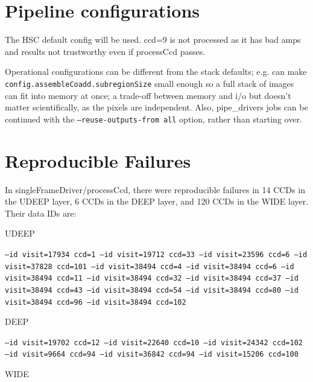\section{Pipeline configurations}
The HSC default config will be used. ccd=9 is not processed as it has bad amps and results not trustworthy even if processCcd passes.

Operational configurations can be different from the stack defaults; e.g. can make \newline \texttt{config.assembleCoadd.subregionSize} small enough so a full stack of images can fit into memory at once; a trade-off between memory and i/o but doesn't matter scientifically, as the pixels are independent. Also, pipe\_drivers jobs can be continued with the \texttt{--reuse-outputs-from all} option, rather than starting over.


\section{Reproducible Failures}
In singleFrameDriver/processCcd, there were reproducible failures in 14 CCDs in the UDEEP layer, 6 CCDs in the DEEP layer, and 120 CCDs in the WIDE layer.  Their data IDs are:

UDEEP

\texttt{--id visit=17934 ccd=1 --id visit=19712 ccd=33 --id visit=23596 ccd=6 --id visit=37828 ccd=101 --id visit=38494 ccd=4 --id visit=38494 ccd=6 --id visit=38494 ccd=11 --id visit=38494 ccd=32 --id visit=38494 ccd=37 --id visit=38494 ccd=43 --id visit=38494 ccd=54 --id visit=38494 ccd=80 --id visit=38494 ccd=96 --id visit=38494 ccd=102}

DEEP

\texttt{--id visit=19702 ccd=12 --id visit=22640 ccd=10 --id visit=24342 ccd=102 --id visit=9664 ccd=94 --id visit=36842 ccd=94 --id visit=15206 ccd=100}

WIDE

